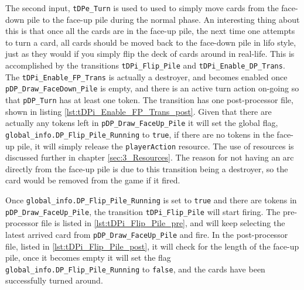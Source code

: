 \documentclass[runningheads,a4paper]{llncs}
\newcommand{\GPenSIM}{../GPenSIM}
\begin{document}
The second input, \verb!tDPe_Turn! is used to used to simply move cards from the face-down pile to the face-up pile during the normal phase. An interesting thing about this is that once all the cards are in the face-up pile, the next time one attempts to turn a \ac{card}, all cards should be moved back to the face-down pile in \ac{lifo} style, just as they would if you simply flip the deck of cards around in real-life. 
\newline
This is accomplished by the transitions \verb!tDPi_Flip_Pile! and \verb!tDPi_Enable_DP_Trans!. The \verb!tDPi_Enable_FP_Trans! is actually a \ac{destroyer}, and becomes enabled once \verb!pDP_Draw_FaceDown_Pile! is empty, and there is an active turn action on-going so that \verb!pDP_Turn! has at least one token. The transition has one post-processor file, shown in listing \ref{lst:tDPi_Enable_FP_Trans_post}. Given that there are actually any tokens left in \verb!pDP_Draw_FaceUp_Pile! it will set the global flag, \verb!global_info.DP_Flip_Pile_Running! to \verb!true!, if there are no tokens in the face-up pile, it will simply release the \verb!playerAction! resource. The use of resources is discussed further in chapter \ref{sec:3_Resources}. The reason for not having an arc directly from the face-up pile is due to this transition being a \ac{destroyer}, so the \ac{card} would be removed from the game if it fired.

Once \verb!global_info.DP_Flip_Pile_Running! is set to \verb!true! and there are tokens in \verb!pDP_Draw_FaceUp_Pile!, the transition \verb!tDPi_Flip_Pile! will start firing. The pre-processor file is listed in \ref{lst:tDPi_Flip_Pile_pre}, and will keep selecting the latest arrived \ac{card} from \verb!pDP_Draw_FaceUp_Pile! and fire. In the post-processor file, listed in \ref{lst:tDPi_Flip_Pile_post}, it will check for the length of the face-up pile, once it becomes empty it will set the flag \verb!global_info.DP_Flip_Pile_Running! to \verb!false!, and the cards have been successfully turned around.


\end{document}
